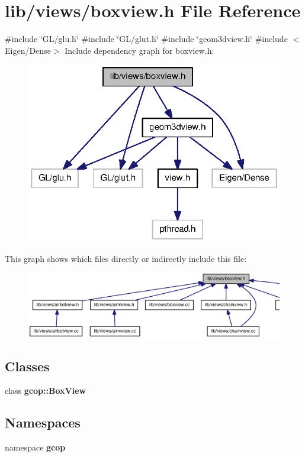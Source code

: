 \section{lib/views/boxview.h \-File \-Reference}
\label{boxview_8h}
{\ttfamily \#include \char`\"{}\-G\-L/glu.\-h\char`\"{}}\*
{\ttfamily \#include \char`\"{}\-G\-L/glut.\-h\char`\"{}}\*
{\ttfamily \#include \char`\"{}geom3dview.\-h\char`\"{}}\*
{\ttfamily \#include $<$\-Eigen/\-Dense$>$}\*
\-Include dependency graph for boxview.\-h\-:\nopagebreak
\begin{figure}[H]
\begin{center}
\leavevmode
\includegraphics[width=322pt]{boxview_8h__incl}
\end{center}
\end{figure}
\-This graph shows which files directly or indirectly include this file\-:\nopagebreak
\begin{figure}[H]
\begin{center}
\leavevmode
\includegraphics[width=350pt]{boxview_8h__dep__incl}
\end{center}
\end{figure}
\subsection*{\-Classes}
\begin{DoxyCompactItemize}
\item 
class {\bf gcop\-::\-Box\-View}
\end{DoxyCompactItemize}
\subsection*{\-Namespaces}
\begin{DoxyCompactItemize}
\item 
namespace {\bf gcop}
\end{DoxyCompactItemize}
